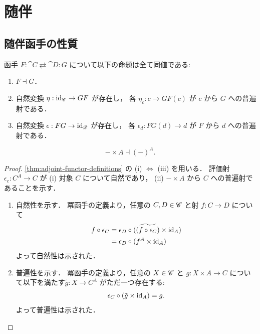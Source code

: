 \documentclass[titlepage]{ltjsreport}
\newtheorem[S]{theorem}{定理}[chapter]
\newtheorem[S]{definition}[theorem]{定義}
\newtheorem[S]{example}[theorem]{例}
\begin{document}
\chapter{随伴}

\section{随伴函手の性質}

\begin{theorem}[随伴函手の並列定義]\label{thm:adjoint-functor-definitions}
  函手 $F:\cat{C}\rightleftarrows\cat{D}:G$ について以下の命題は全て同値である:
  \begin{enumerate}
    \item $F\dashv G$．
    \item 自然変換 $\eta:\mathrm{id}_{\mathscr{C}}\to GF$ が存在し，
          各 $\eta_c:c\to GF(c)$ が $c$ から $G$ への普遍射である．
    \item 自然変換 $\epsilon:FG\to\mathrm{id}_{\mathscr{D}}$ が存在し，
          各 $\epsilon_d:FG(d)\to d$ が $F$ から $d$ への普遍射である．
  \end{enumerate}
\end{theorem}

\begin{theorem}[並列定義の系]
  \begin{equation}
    -\times A\dashv{(-)}^A.
  \end{equation}
\end{theorem}

\begin{proof}
  \cref{thm:adjoint-functor-definitions} の (i) $\Leftrightarrow$ (iii) を用いる．
  評価射 $\epsilon_c:{C}^A\to C$ が
  (i) 対象 $C$ について自然であり，
  (ii) $-\times A$ から $C$ への普遍射であることを示す．

  \begin{enumerate}[label=(\roman*)] %
    \item 自然性を示す．
          冪函手の定義より，任意の $C,D\in\mathscr{C}$ と射 $f:C\to D$ について
          \begin{align*}
            f\circ\epsilon_C
             & =\epsilon_D\circ(\widetilde{(f\circ\epsilon_C)}\times\mathrm{id}_{A}) \\
             & =\epsilon_D\circ(f^A\times\mathrm{id}_{A})                            \\
          \end{align*}
          よって自然性は示された．
    \item 普遍性を示す．
          冪函手の定義より，任意の $X\in\mathscr{C}$ と $g:X\times A\to C$
          について以下を満たす$\tilde{g}:X\to C^A$ がただ一つ存在する:
          \begin{equation*}
            \epsilon_C\circ(\tilde{g}\times\mathrm{id}_{A})=g.
          \end{equation*}
          よって普遍性は示された．
  \end{enumerate}
\end{proof}
\end{document}
